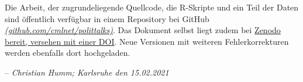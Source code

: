 \documentclass[a4paper,parskip=half,german,DIV=10,captions=tableheading]{scrreprt}
\begin{document}
Die Arbeit, der zugrundeliegende Quellcode, die R-Skripte und ein Teil der Daten sind öffentlich verfügbar in einem Repository bei GitHub \href{https://github.com/cmlnet/polittalks}{\textit{(github.com/cmlnet/polittalks)}}. Das Dokument selbst liegt zudem bei \href{https://doi.org/10.5281/zenodo.4541440}{Zenodo bereit, versehen mit einer DOI}. Neue Versionen mit weiteren Fehlerkorrekturen werden ebenfalls dort hochgeladen.

-- \textit{Christian Humm; Karlsruhe den 15.02.2021}

\tableofcontents








\printbibliography
\listoffigures
\listoftables


\end{document}
